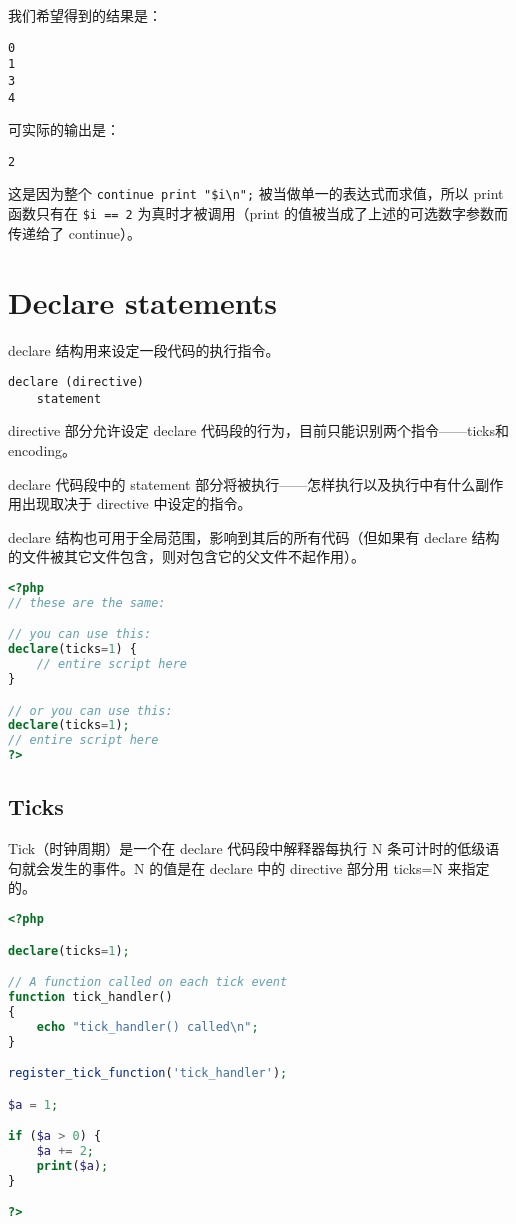 我们希望得到的结果是：

\begin{verbatim}
0
1
3
4
\end{verbatim}

可实际的输出是：

\begin{verbatim}
2
\end{verbatim}

这是因为整个 \texttt{continue print "\$i\textbackslash n";} 被当做单一的表达式而求值，所以 print 函数只有在 \texttt{\$i == 2} 为真时才被调用（print 的值被当成了上述的可选数字参数而传递给了 continue）。


\section{Declare statements}

declare 结构用来设定一段代码的执行指令。

\begin{verbatim}
declare (directive)
    statement
\end{verbatim}

directive 部分允许设定 declare 代码段的行为，目前只能识别两个指令——ticks和encoding。

declare 代码段中的 statement 部分将被执行——怎样执行以及执行中有什么副作用出现取决于 directive 中设定的指令。

declare 结构也可用于全局范围，影响到其后的所有代码（但如果有 declare 结构的文件被其它文件包含，则对包含它的父文件不起作用）。

\begin{lstlisting}[language=PHP]
<?php
// these are the same:

// you can use this:
declare(ticks=1) {
    // entire script here
}

// or you can use this:
declare(ticks=1);
// entire script here
?>
\end{lstlisting}

\subsection{Ticks}

Tick（时钟周期）是一个在 declare 代码段中解释器每执行 N 条可计时的低级语句就会发生的事件。N 的值是在 declare 中的 directive 部分用 ticks=N 来指定的。

\begin{lstlisting}[language=PHP]
<?php

declare(ticks=1);

// A function called on each tick event
function tick_handler()
{
    echo "tick_handler() called\n";
}

register_tick_function('tick_handler');

$a = 1;

if ($a > 0) {
    $a += 2;
    print($a);
}

?>
\end{lstlisting}

